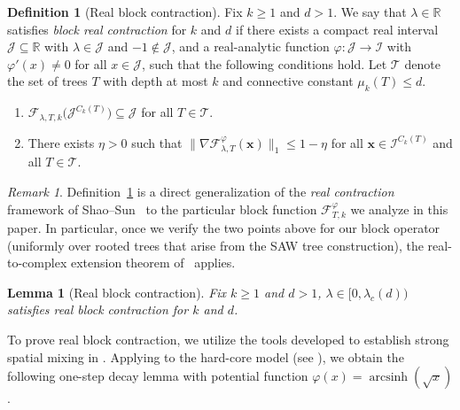 \documentclass[a4paper,11pt]{article}
\DeclareMathOperator{\arcsinh}{arcsinh}
\theoremstyle{plain}
\newtheorem{lemma}[theorem]{Lemma}
\theoremstyle{definition}
\newtheorem{definition}[theorem]{Definition}
\theoremstyle{remark}
\newtheorem{remark}[theorem]{Remark}
\newcommand{\1}{\mathbf{1}}
\newcommand{\R}{\mathbb{R}}
\begin{document}
\begin{definition}[Real block contraction]\label{real_contraction}
Fix $k\ge 1$ and $d>1$.
We say that $\lambda \in \R$ satisfies \emph{block real contraction} 
for $k$ and $d$ if there exists a compact real interval
$\mathcal{J}\subseteq\R$ with $\lambda\in\mathcal{J}$ and $-1 \notin \mathcal{J}$,
and a real-analytic function
$\varphi:\mathcal{J}\to\mathcal{I}$ with $\varphi'(x) \neq 0$
for all $x\in \mathcal{J}$, such that the following conditions hold.
Let $\mathcal{T}$ denote the set of trees $T$ with depth at most $k$
and connective constant $\mu_k(T)\le d$.
\begin{enumerate}[leftmargin=2em]
    \item $\mathcal{F}_{\lambda,T,k}\bigl(\mathcal{J}^{C_k(T)}\bigr) \subseteq \mathcal{J}$
    for all $T\in \mathcal{T}$.
    
    \item There exists $\eta>0$ such that
    \(
        \bigl\|\nabla \mathcal{F}^{\varphi}_{\lambda,T}(\mathbf x)\bigr\|_{1}
        \le 1-\eta
    \)
    for all $\mathbf x\in \mathcal{I}^{C_k(T)}$ and all $T\in \mathcal{T}$.
\end{enumerate}
\end{definition}

\begin{remark}
Definition~\ref{real_contraction} is a direct generalization of the \emph{real contraction} framework of
Shao--Sun~\cite{shao2021contraction}
to the particular block function $\mathcal{F}^{\varphi}_{T,k}$ we analyze in this paper.
In particular, once we verify the two points above for our block operator (uniformly over rooted trees that arise from the SAW tree
construction), the real-to-complex extension theorem of~\cite{shao2021contraction} applies.
\end{remark}

\begin{lemma}[Real block contraction]\label{lem:real-contraction}
    Fix $k\geq 1$ and $d>1$, $\lambda \in [0,\lambda_c(d))$ 
    satisfies real block contraction for $k$ and $d$.
\end{lemma}

To prove real block contraction, we utilize the tools developed to establish strong spatial mixing in \cite{sinclair2017spatial}. Applying \cite[Lem.~3.3]{sinclair2017spatial} to the hard-core model (see \cite[Sec.~4]{sinclair2017spatial}), we obtain the following one-step decay lemma
with potential function $\varphi(x)=\arcsinh(\sqrt{x})$.
\end{document}
